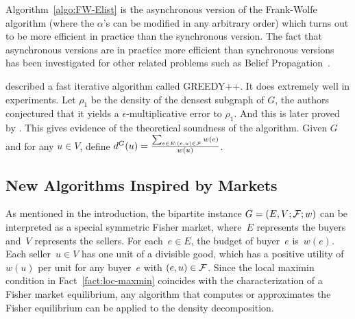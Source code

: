 { 
Algorithm~\ref{algo:FW-Elist} is the asynchronous version of the Frank-Wolfe algorithm (where the $\alpha$'s can be modified in any arbitrary order) which turns out to be more efficient in practice than the synchronous version. The fact that asynchronous versions are in practice more efficient than synchronous versions has been investigated for other related problems such as Belief Propagation~\cite{DBLP:journals/corr/ElidanMK12}.




\cite{DBLP:conf/www/BoobGPSTWW20} described a fast iterative algorithm called GREEDY++. It does extremely well in experiments. Let $\rho_1$ be the density of the densest subgraph of $G$, the authors conjectured that it yields a $\epsilon$-multiplicative error to $\rho_1$. And this is later proved by \cite{DBLP:conf/soda/ChekuriQT22}. This gives evidence of the theoretical soundness of the algorithm. Given $G$ and for any $u \in V$, define $d^G(u) = \frac{\sum_{e \in E: (e, u) \in \mathcal {F}}w(e)}{w(u)}$. %






}


\subsection{New Algorithms Inspired by Markets}


As mentioned in the introduction, the bipartite instance $G = (E, V; \mathcal {F}; w)$ can be interpreted as a special symmetric Fisher market, where~$E$ represents the buyers and~$V$ represents the sellers. For each~$e \in E$, the budget of buyer~$e$ is~$w(e)$. Each seller~$u \in V$ has one unit of a divisible good, which has a positive utility of~$w(u)$ per unit for any buyer~$e$ with $(e, u) \in \mathcal {F}$. Since the local maximin condition in 
Fact~\ref{fact:loc-maxmin}
coincides with the characterization of a Fisher market equilibrium, any algorithm that computes or approximates the Fisher equilibrium can be applied to the density decomposition.

